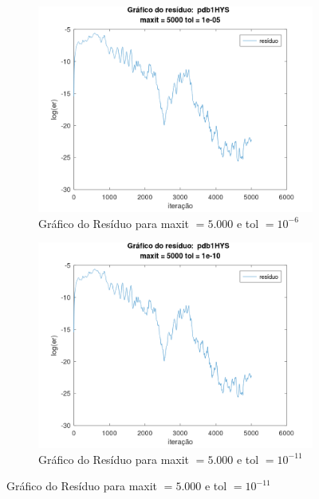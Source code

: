 \begin{figure}[H]
    \centering
    \begin{subfigure}[t]{0.4\linewidth}
         \centering
         \includegraphics[width=\textwidth]{image/pdb1HYS_5000_-6.png}
         \caption{Gráfico do Resíduo para maxit $= 5.000$ e tol $=10^{-6}$}
         \label{fig:pdb1HYS-5-6}
    \end{subfigure}
    \quad
    \begin{subfigure}[t]{0.4\linewidth}
         \centering
         \includegraphics[width=\textwidth]{image/pdb1HYS_5000_-11.png}
         \caption{Gráfico do Resíduo para maxit $= 5.000$ e tol $=10^{-11}$}
         \label{fig:pdb1HYS-5-11}
    \end{subfigure}

\end{figure}

